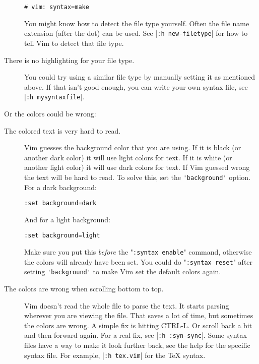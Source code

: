 \begin{description}
								\begin{Verbatim}[samepage=true]
		 # vim: syntax=make

								\end{Verbatim}

								You might know how to detect the file type yourself.
								Often the file name extension (after the dot) can be used.
								See |\verb!:h new-filetype!| for how to tell Vim to detect that file type.

				\item [There is no highlighting for your file type.]
								You could try using a similar file type by manually setting it as mentioned above.
								If that isn't good enough, you can write your own syntax file, see |\verb!:h mysyntaxfile!|.
\end{description}

Or the colors could be wrong:

\begin{description}
				\item [The colored text is very hard to read.]
								Vim guesses the background color that you are using.  If it is black
								(or another dark color) it will use light colors for text.  If it is
								white (or another light color) it will use dark colors for text.  If
								Vim guessed wrong the text will be hard to read.  To solve this, set
								the \verb!'background'! option.  For a dark background:

								\begin{Verbatim}[samepage=true]
		 :set background=dark
												\end{Verbatim}

								And for a light background:

								\begin{Verbatim}[samepage=true]
		 :set background=light
												\end{Verbatim}

								Make sure you put this \emph{before} the "\verb!:syntax enable!" command, otherwise the colors will already have been set.
								You could do "\verb!:syntax reset!" after setting \verb!'background'! to make Vim set the default colors again.

				\item [The colors are wrong when scrolling bottom to top.]
								Vim doesn't read the whole file to parse the text.
								It starts parsing wherever you are viewing the file.
								That saves a lot of time, but sometimes the colors are wrong.
								A simple fix is hitting CTRL-L.
								Or scroll back a bit and then forward again.
								For a real fix, see |\verb!:h :syn-sync!|.
								Some syntax files have a way to make it look further back, see the help for the specific syntax file.
								For example, |\verb!:h tex.vim!| for the TeX syntax.
\end{description}

